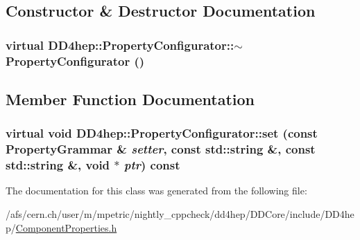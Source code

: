 \subsection{Constructor \& Destructor Documentation}
\hypertarget{class_d_d4hep_1_1_property_configurator_ab634d5cb9b04f998d49465b8fb5aa507}{
\subsubsection[{$\sim$PropertyConfigurator}]{\setlength{\rightskip}{0pt plus 5cm}virtual DD4hep::PropertyConfigurator::$\sim$PropertyConfigurator ()}}
\label{class_d_d4hep_1_1_property_configurator_ab634d5cb9b04f998d49465b8fb5aa507}


\subsection{Member Function Documentation}
\hypertarget{class_d_d4hep_1_1_property_configurator_a863dbbfed205e1a74c7e81dd1375843f}{
\subsubsection[{set}]{\setlength{\rightskip}{0pt plus 5cm}virtual void DD4hep::PropertyConfigurator::set (const {\bf PropertyGrammar} \& {\em setter}, \/  const std::string \&, \/  const std::string \&, \/  void $\ast$ {\em ptr}) const}}
\label{class_d_d4hep_1_1_property_configurator_a863dbbfed205e1a74c7e81dd1375843f}


The documentation for this class was generated from the following file:\begin{DoxyCompactItemize}
\item 
/afs/cern.ch/user/m/mpetric/nightly\_\-cppcheck/dd4hep/DDCore/include/DD4hep/\hyperlink{_component_properties_8h}{ComponentProperties.h}\end{DoxyCompactItemize}
